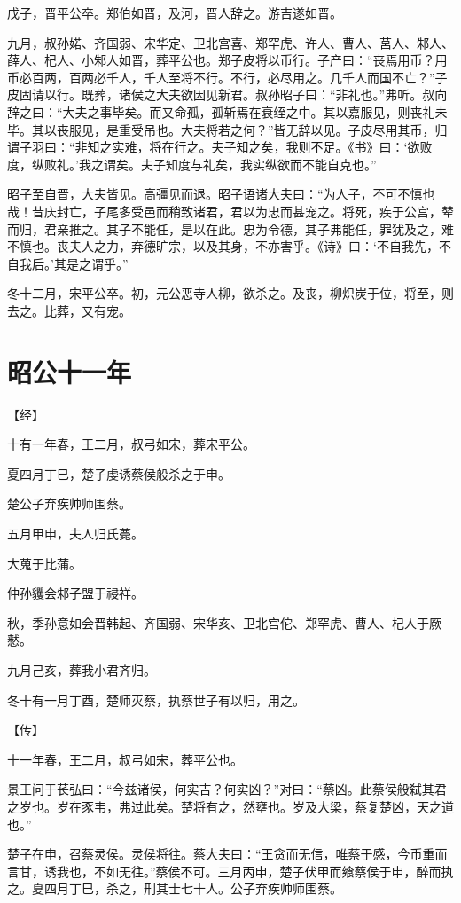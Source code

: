 \documentclass[a4paper,12pt,UTF8,twoside]{ctexbook}
\begin{document}
戊子，晋平公卒。郑伯如晋，及河，晋人辞之。游吉遂如晋。

九月，叔孙婼、齐国弱、宋华定、卫北宫喜、郑罕虎、许人、曹人、莒人、邾人、薛人、杞人、小邾人如晋，葬平公也。郑子皮将以币行。子产曰：“丧焉用币？用币必百两，百两必千人，千人至将不行。不行，必尽用之。几千人而国不亡？”子皮固请以行。既葬，诸侯之大夫欲因见新君。叔孙昭子曰：“非礼也。”弗听。叔向辞之曰：“大夫之事毕矣。而又命孤，孤斩焉在衰绖之中。其以嘉服见，则丧礼未毕。其以丧服见，是重受吊也。大夫将若之何？”皆无辞以见。子皮尽用其币，归谓子羽曰：“非知之实难，将在行之。夫子知之矣，我则不足。《书》曰：‘欲败度，纵败礼。’我之谓矣。夫子知度与礼矣，我实纵欲而不能自克也。”

昭子至自晋，大夫皆见。高彊见而退。昭子语诸大夫曰：“为人子，不可不慎也哉！昔庆封亡，子尾多受邑而稍致诸君，君以为忠而甚宠之。将死，疾于公宫，辇而归，君亲推之。其子不能任，是以在此。忠为令德，其子弗能任，罪犹及之，难不慎也。丧夫人之力，弃德旷宗，以及其身，不亦害乎。《诗》曰：‘不自我先，不自我后。’其是之谓乎。”

冬十二月，宋平公卒。初，元公恶寺人柳，欲杀之。及丧，柳炽炭于位，将至，则去之。比葬，又有宠。

\section{昭公十一年}



【经】

十有一年春，王二月，叔弓如宋，葬宋平公。

夏四月丁巳，楚子虔诱蔡侯般杀之于申。

楚公子弃疾帅师围蔡。

五月甲申，夫人归氏薨。

大蒐于比蒲。

仲孙貜会邾子盟于祲祥。

秋，季孙意如会晋韩起、齐国弱、宋华亥、卫北宫佗、郑罕虎、曹人、杞人于厥慭。

九月己亥，葬我小君齐归。

冬十有一月丁酉，楚师灭蔡，执蔡世子有以归，用之。

【传】

十一年春，王二月，叔弓如宋，葬平公也。

景王问于苌弘曰：“今兹诸侯，何实吉？何实凶？”对曰：“蔡凶。此蔡侯般弑其君之岁也。岁在豕韦，弗过此矣。楚将有之，然壅也。岁及大梁，蔡复楚凶，天之道也。”

楚子在申，召蔡灵侯。灵侯将往。蔡大夫曰：“王贪而无信，唯蔡于感，今币重而言甘，诱我也，不如无往。”蔡侯不可。三月丙申，楚子伏甲而飨蔡侯于申，醉而执之。夏四月丁巳，杀之，刑其士七十人。公子弃疾帅师围蔡。
\end{document}
